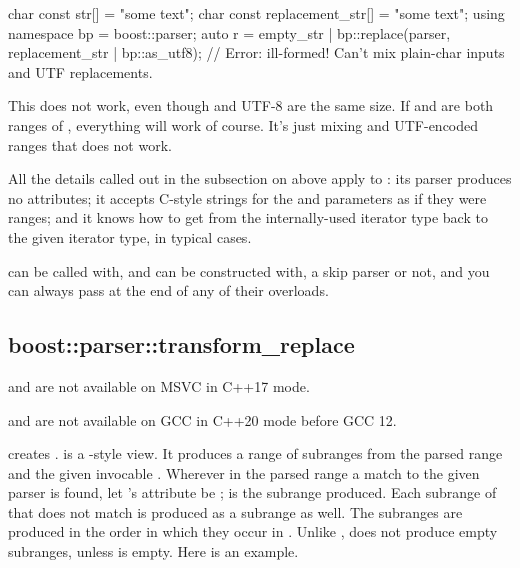 \documentclass{MyBook}
\begin{document}
\begin{code}
char const str[] = "some text";
char const replacement_str[] = "some text";
using namespace bp = boost::parser;
auto r = empty_str | bp::replace(parser, replacement_str | bp::as_utf8); // Error: ill-formed!  Can't mix plain-char inputs and UTF replacements.
\end{code}

This does not work, even though  and UTF-8 are the same size. If  and  are both ranges of , everything will work of course. It's just mixing  and UTF-encoded ranges that does not work.

All the details called out in the subsection on  above apply to : its parser produces no attributes; it accepts C-style strings for the  and  parameters as if they were ranges; and it knows how to get from the internally-used iterator type back to the given iterator type, in typical cases.

 can be called with, and  can be constructed with, a skip parser or not, and you can always pass  at the end of any of their overloads.

\subsection{boost::parser::transform\_replace}

\begin{marker}[title=Important ]
 and  are not available on MSVC in C++17 mode. 
\end{marker}

\begin{marker}[title=Important ]
 and  are not available on GCC in C++20 mode before GCC 12. 
\end{marker}

 creates .  is a -style view. It produces a range of subranges from the parsed range  and the given invocable . Wherever in the parsed range a match to the given parser  is found, let 's attribute be ;  is the subrange produced. Each subrange of  that does not match  is produced as a subrange as well. The subranges are produced in the order in which they occur in . Unlike ,  does not produce empty subranges, unless  is empty. Here is an example.
\end{document}
